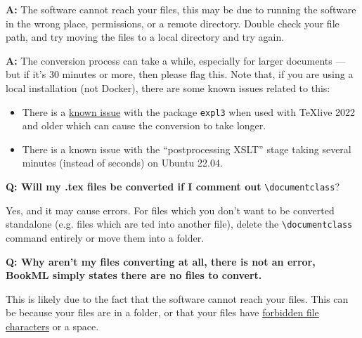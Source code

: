 \begin{description}[style=nextline]
\item[Q: Error: \texttt{Warning: no .tex files with \textbackslash{}documentclass found in this directory}]

\textbf{A:} The software cannot reach your files, this may be due to running the software in the wrong place, permissions, or a remote directory. 
Double check your file path, and try moving the files to a local directory and try again.

\item[Q: The conversion process is taking a very long time.]

\textbf{A:} The conversion process can take a while, especially for larger documents --- but if it's 30 minutes or more, then please flag this. Note that, if you are using a local installation (not Docker), there are some known issues related to this:
    \begin{itemize}
        \item There is a \href{https://github.com/brucemiller/LaTeXML/issues/2268}{known issue} with the package \verb|expl3| when used with TeXlive 2022 and older which can cause the conversion to take longer.
        \item There is a known issue with the ``postprocessing XSLT'' stage taking several minutes (instead of seconds) on Ubuntu 22.04.
    \end{itemize}

\end{description}
 
\noindent\textbf{Q: Will my .tex files be converted if I comment out} \verb|\|\verb|documentclass|? 
\begin{ans}
    Yes, and it may cause errors. For files which you don't want to be converted standalone (e.g. files which are \verb||ted into another file), delete the \verb|\|\verb|documentclass| command entirely or move them into a folder.
\end{ans}

\noindent\textbf{Q: Why aren't my files converting at all, there is not an error, BookML simply states there are no files to convert.} 
\begin{ans}
    This is likely due to the fact that the software cannot reach your files. This can be because your files are in a folder, or that your files have \href{https://stackoverflow.com/questions/1976007/what-characters-are-forbidden-in-windows-and-linux-directory-names}{forbidden file characters} or a space.
    
\end{ans}

